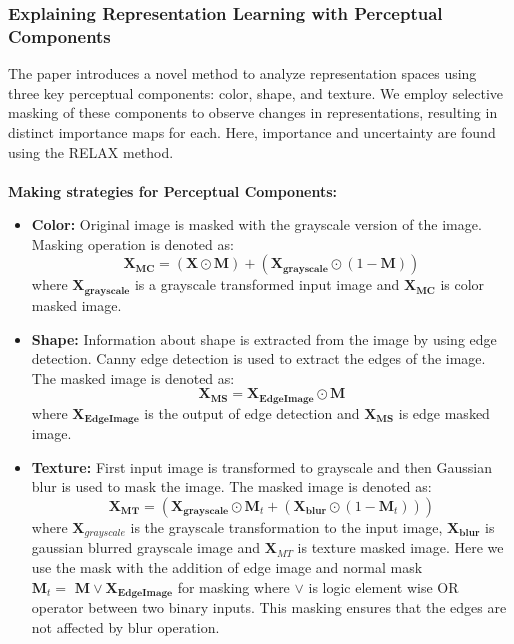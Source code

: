 \subsubsection{Explaining Representation Learning with Perceptual Components \cite{yarici2024explaining}}
The paper introduces a novel method to analyze representation spaces using three key perceptual components: color, shape, and texture. We employ selective masking of these components to observe changes in representations, resulting in distinct importance maps for each. Here, importance and uncertainty are found using the RELAX method. \\
\\
\textbf{Making strategies for Perceptual Components:}
\vspace{3mm}
\begin{itemize}
    \item \textbf{Color:} Original image is masked with the grayscale version of the image. Masking operation is denoted as:
    \begin{equation*}
        \mathbf{X_{MC}}= (\mathbf{X} \odot \textbf{M}) + (\mathbf{X_{grayscale}} \odot (1-\textbf{M}))
    \end{equation*}
    where $\mathbf{X_{grayscale}}$ is a grayscale transformed input image and $\mathbf{X_{MC}}$ is color masked image.
    \vspace{3mm}
    \item \textbf{Shape:} Information about shape is extracted from the image by using edge detection. Canny edge detection is used to extract the edges of the image. The masked image is denoted as:
    \begin{equation*}
        \mathbf{X_{MS}}= \mathbf{X_{EdgeImage}} \odot \mathbf{M}  
    \end{equation*}
    where $\mathbf{X_{EdgeImage}}$ is the output of edge detection and $\mathbf{X_{MS}}$ is edge masked image.
    \vspace{3mm}
    \item \textbf{Texture:} First input image is transformed to grayscale and then Gaussian blur is used to mask the image. The masked image is denoted as:
    \begin{equation*}
        \mathbf{X_{MT}}=  (\mathbf{X_{grayscale}} \odot \textbf{M}_{t} + (\mathbf{X_{blur}} \odot (1-\textbf{M}_t))) 
    \end{equation*}
    where $\textbf{X}_{grayscale}$ is the grayscale transformation to the input image, $\mathbf{X_{blur}}$ is gaussian blurred grayscale image  and $\textbf{X}_{MT}$ is texture masked image. Here we use the mask with the addition of edge image and normal mask $\textbf{M}_t=\textbf{ M}  \lor \mathbf{X_{EdgeImage}}$ for masking where $\lor$ is logic element wise OR operator between two binary inputs. This masking ensures that the edges are not affected by blur operation. 
\end{itemize}